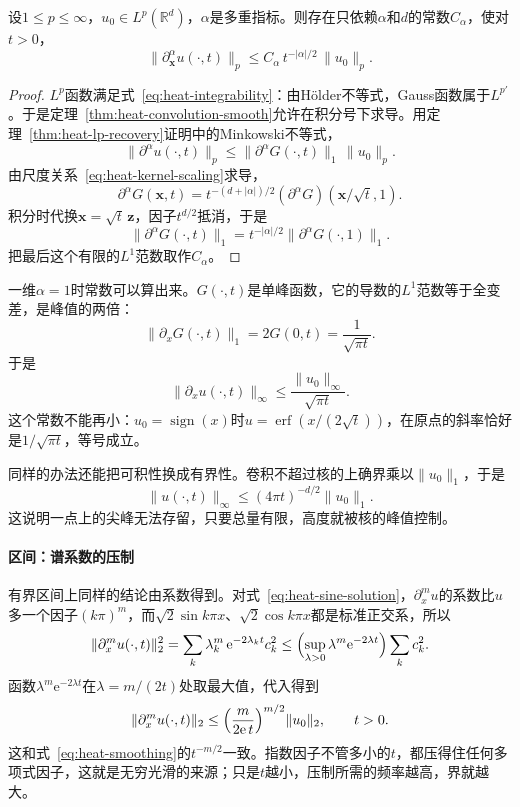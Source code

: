 \begin{theorem}[全空间的平滑估计]
\label{thm:heat-smoothing}
设$1\leq p\leq\infty$，$u_0\in L^p(\mathbb{R}^{d})$，$\alpha$是多重指标。则存在只依赖$\alpha$和$d$的常数$C_\alpha$，使对$t>0$，
\begin{equation}
 \lVert\partial^\alpha_{\bm{x}}u(\cdot,t)\rVert_p\leq C_\alpha\,t^{-\lvert\alpha\rvert/2}\,\lVert u_0\rVert_p .
 \label{eq:heat-smoothing}
\end{equation}
\end{theorem}

\begin{proof}
$L^p$函数满足式~\eqref{eq:heat-integrability}：由Hölder不等式，Gauss函数属于$L^{p'}$。于是定理~\ref{thm:heat-convolution-smooth}允许在积分号下求导。用定理~\ref{thm:heat-lp-recovery}证明中的Minkowski不等式，
\[
 \lVert\partial^\alpha u(\cdot,t)\rVert_p\leq\lVert\partial^\alpha G(\cdot,t)\rVert_1\,\lVert u_0\rVert_p .
\]
由尺度关系~\eqref{eq:heat-kernel-scaling}求导，
\[
 \partial^\alpha G(\bm{x},t)=t^{-(d+\lvert\alpha\rvert)/2}(\partial^\alpha G)(\bm{x}/\sqrt{t},1) .
\]
积分时代换$\bm{x}=\sqrt{t}\,\bm{z}$，因子$t^{d/2}$抵消，于是
\[
 \lVert\partial^\alpha G(\cdot,t)\rVert_1=t^{-\lvert\alpha\rvert/2}\lVert\partial^\alpha G(\cdot,1)\rVert_1 .
\]
把最后这个有限的$L^1$范数取作$C_\alpha$。
\end{proof}

一维$\alpha=1$时常数可以算出来。$G(\cdot,t)$是单峰函数，它的导数的$L^1$范数等于全变差，是峰值的两倍：
\[
 \lVert\partial_xG(\cdot,t)\rVert_1=2G(0,t)=\frac{1}{\sqrt{\pi t}} .
\]
于是
\[
 \lVert\partial_xu(\cdot,t)\rVert_\infty\leq\frac{\lVert u_0\rVert_\infty}{\sqrt{\pi t}} .
\]
这个常数不能再小：$u_0=\operatorname{sign}(x)$时$u=\operatorname{erf}(x/(2\sqrt{t}))$，在原点的斜率恰好是$1/\sqrt{\pi t}$，等号成立。

同样的办法还能把可积性换成有界性。卷积不超过核的上确界乘以$\lVert u_0\rVert_1$，于是
\[
 \lVert u(\cdot,t)\rVert_\infty\leq(4\pi t)^{-d/2}\lVert u_0\rVert_1 .
\]
这说明一点上的尖峰无法存留，只要总量有限，高度就被核的峰值控制。

\paragraph{区间：谱系数的压制}
有界区间上同样的结论由系数得到。对式~\eqref{eq:heat-sine-solution}，$\partial_x^mu$的系数比$u$多一个因子$(k\pi)^m$，而$\sqrt2\sin k\pi x$、$\sqrt2\cos k\pi x$都是标准正交系，所以
\[
 \lVert\partial_x^mu(\cdot,t)\rVert_2^2=\sum_k\lambda_k^m\,\mathrm{e}^{-2\lambda_kt}c_k^2\leq\Bigl(\sup_{\lambda>0}\lambda^m\mathrm{e}^{-2\lambda t}\Bigr)\sum_kc_k^2 .
\]
函数$\lambda^m\mathrm{e}^{-2\lambda t}$在$\lambda=m/(2t)$处取最大值，代入得到
\begin{equation}
 \lVert\partial_x^mu(\cdot,t)\rVert_2\leq\Bigl(\frac{m}{2\mathrm{e}\,t}\Bigr)^{m/2}\lVert u_0\rVert_2,\qquad t>0 .
 \label{eq:heat-spectral-smoothing}
\end{equation}
这和式~\eqref{eq:heat-smoothing}的$t^{-m/2}$一致。指数因子不管多小的$t$，都压得住任何多项式因子，这就是无穷光滑的来源；只是$t$越小，压制所需的频率越高，界就越大。

